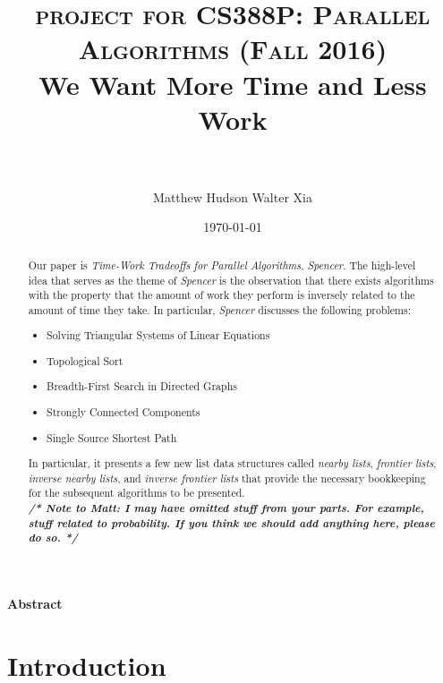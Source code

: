\documentclass[paper=a4, fontsize=11pt]{scrartcl} %
\title{	
\normalfont \normalsize 
\textsc{project for CS388P: Parallel Algorithms (Fall 2016)} 
\horrule{0.5pt} \\[0.4cm] %
\huge We Want More Time and Less Work \\ %
\horrule{2pt} \\[0.5cm] %
}
\author{Matthew Hudson \hspace{5mm} Walter Xia }	%
\date{\normalsize\today} %
\numberwithin{equation}{section} %
\numberwithin{figure}{section} %
\numberwithin{table}{section} %
\begin{document}
\maketitle %

\justify
\textbf{Abstract}

\begin{abstract}
Our paper is \textit{Time-Work Tradeoffs for Parallel Algorithms}, \textit{Spencer\cite{S97}}. The high-level idea that serves as the theme of \textit{Spencer\cite{S97}} is the observation that there exists algorithms with the property that the amount of work they perform is inversely related to the amount of time they take. In particular, \textit{Spencer\cite{S97}} discusses the following problems:

\begin{itemize}
\item Solving Triangular Systems of Linear Equations
\item Topological Sort
\item Breadth-First Search in Directed Graphs
\item Strongly Connected Components
\item Single Source Shortest Path
\end{itemize}

In particular, it presents a few new list data structures called \textit{nearby lists}, \textit{frontier lists}, \textit{inverse nearby lists}, and \textit{inverse frontier lists} that provide the necessary bookkeeping for the subsequent algorithms to be presented. \\
\textbf{\textit{/* Note to Matt: I may have omitted stuff from your parts. For example, stuff related to probability. If you think we should add anything here, please do so. */}}

\end{abstract}


\section{Introduction}
\end{document}
